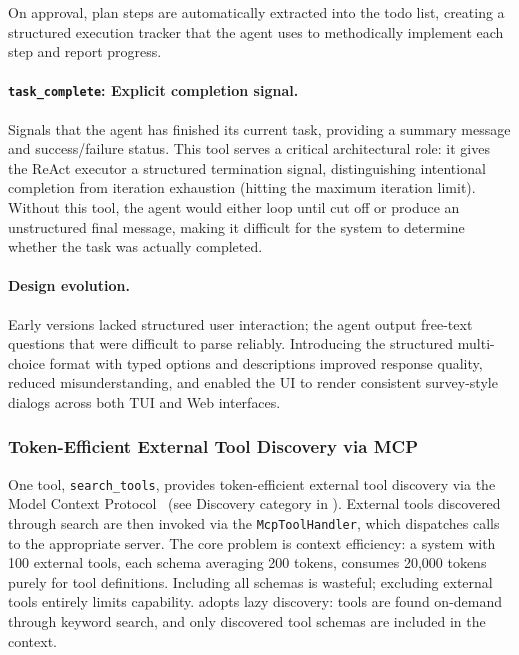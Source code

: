 On approval, plan steps are automatically extracted into the todo list, creating a structured execution tracker that the agent uses to methodically implement each step and report progress.

\paragraph{\texttt{task\_complete}: Explicit completion signal.} Signals that the agent has finished its current task, providing a summary message and success/failure status. This tool serves a critical architectural role: it gives the ReAct executor a structured termination signal, distinguishing intentional completion from iteration exhaustion (hitting the maximum iteration limit). Without this tool, the agent would either loop until cut off or produce an unstructured final message, making it difficult for the system to determine whether the task was actually completed.

\paragraph{Design evolution.} Early versions lacked structured user interaction; the agent output free-text questions that were difficult to parse reliably. Introducing the structured multi-choice format with typed options and descriptions improved response quality, reduced misunderstanding, and enabled the UI to render consistent survey-style dialogs across both TUI and Web interfaces.

\subsubsection{Token-Efficient External Tool Discovery via MCP}
\label{sec:mcp}

One tool, \texttt{search\_tools}, provides token-efficient external tool discovery via the Model Context Protocol~\cite{anthropic2024mcp} (see Discovery category in ). External tools discovered through search are then invoked via the \texttt{McpToolHandler}, which dispatches calls to the appropriate server. The core problem is context efficiency: a system with 100 external tools, each schema averaging 200 tokens, consumes 20,000 tokens purely for tool definitions. Including all schemas is wasteful; excluding external tools entirely limits capability. \name adopts lazy discovery: tools are found on-demand through keyword search, and only discovered tool schemas are included in the context.

